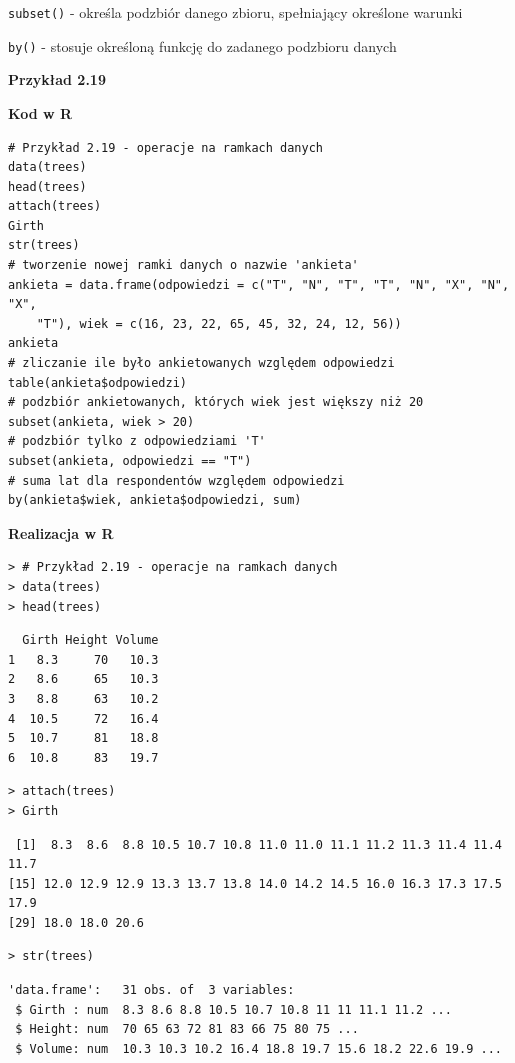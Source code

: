 \documentclass[12pt,B5paper,]{book}
\begin{document}
\texttt{subset()} - określa podzbiór danego zbioru, spełniający
określone warunki

\texttt{by()} - stosuje określoną funkcję do zadanego podzbioru danych

\vspace{0.8cm} \textbf{Przykład 2.19}

\textbf{Kod w R}

\begin{verbatim}
# Przykład 2.19 - operacje na ramkach danych
data(trees)
head(trees)
attach(trees)
Girth
str(trees)
# tworzenie nowej ramki danych o nazwie 'ankieta'
ankieta = data.frame(odpowiedzi = c("T", "N", "T", "T", "N", "X", "N", "X", 
    "T"), wiek = c(16, 23, 22, 65, 45, 32, 24, 12, 56))
ankieta
# zliczanie ile było ankietowanych względem odpowiedzi
table(ankieta$odpowiedzi)
# podzbiór ankietowanych, których wiek jest większy niż 20
subset(ankieta, wiek > 20)
# podzbiór tylko z odpowiedziami 'T'
subset(ankieta, odpowiedzi == "T")
# suma lat dla respondentów względem odpowiedzi
by(ankieta$wiek, ankieta$odpowiedzi, sum)
\end{verbatim}

\newpage

\textbf{Realizacja w R}

\begin{verbatim}
> # Przykład 2.19 - operacje na ramkach danych
> data(trees)
> head(trees)
\end{verbatim}

\begin{verbatim}
  Girth Height Volume
1   8.3     70   10.3
2   8.6     65   10.3
3   8.8     63   10.2
4  10.5     72   16.4
5  10.7     81   18.8
6  10.8     83   19.7
\end{verbatim}

\begin{verbatim}
> attach(trees)
> Girth
\end{verbatim}

\begin{verbatim}
 [1]  8.3  8.6  8.8 10.5 10.7 10.8 11.0 11.0 11.1 11.2 11.3 11.4 11.4 11.7
[15] 12.0 12.9 12.9 13.3 13.7 13.8 14.0 14.2 14.5 16.0 16.3 17.3 17.5 17.9
[29] 18.0 18.0 20.6
\end{verbatim}

\begin{verbatim}
> str(trees)
\end{verbatim}

\begin{verbatim}
'data.frame':   31 obs. of  3 variables:
 $ Girth : num  8.3 8.6 8.8 10.5 10.7 10.8 11 11 11.1 11.2 ...
 $ Height: num  70 65 63 72 81 83 66 75 80 75 ...
 $ Volume: num  10.3 10.3 10.2 16.4 18.8 19.7 15.6 18.2 22.6 19.9 ...
\end{verbatim}
\end{document}
